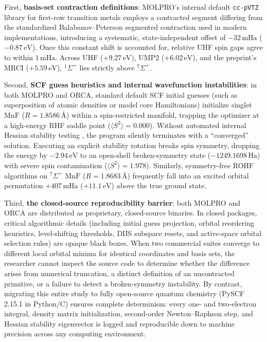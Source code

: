 \documentclass[10pt,twocolumn]{article}
\begin{document}
First, \textbf{basis-set contraction definitions}: MOLPRO's internal default \texttt{cc-pVTZ} library for first-row transition metals employs a contracted segment differing from the standardized Balabanov--Peterson segmented contraction \cite{balabanov2005} used in modern implementations, introducing a systematic, state-independent offset of $-32\,\mathrm{mHa}$ ($-0.87\,\mathrm{eV}$). Once this constant shift is accounted for, relative UHF spin gaps agree to within $1\,\mathrm{mHa}$. Across UHF ($+9.27\,\mathrm{eV}$), UMP2 ($+6.02\,\mathrm{eV}$), and the preprint's MRCI ($+5.59\,\mathrm{eV}$), $^1\Sigma^+$ lies strictly above $^7\Sigma^+$.

Second, \textbf{SCF guess heuristics and internal wavefunction instabilities}: in both MOLPRO and ORCA, standard default SCF initial guesses (such as superposition of atomic densities or model core Hamiltonians) initialize singlet $\mathrm{MnF}$ ($R = 1.8586\,$\AA) within a spin-restricted manifold, trapping the optimizer at a high-energy RHF saddle point ($\langle S^2 \rangle = 0.000$). Without automated internal Hessian stability testing \cite{seeger1977}, the program silently terminates with a ``converged'' solution. Executing an explicit stability rotation breaks spin symmetry, dropping the energy by $-2.94\,\mathrm{eV}$ to an open-shell broken-symmetry state ($-1249.1698\,\mathrm{Ha}$) with severe spin contamination ($\langle S^2 \rangle = 1.978$). Similarly, symmetry-free ROHF algorithms on $^7\Sigma^+$ $\mathrm{MnF}$ ($R = 1.8683\,$\AA) frequently fall into an excited orbital permutation $+407\,\mathrm{mHa}$ ($+11.1\,\mathrm{eV}$) above the true ground state.

Third, \textbf{the closed-source reproducibility barrier}: both MOLPRO and ORCA are distributed as proprietary, closed-source binaries. In closed packages, critical algorithmic details (including initial guess projection, orbital reordering heuristics, level-shifting thresholds, DIIS subspace resets, and active-space orbital selection rules) are opaque black boxes. When two commercial suites converge to different local orbital minima for identical coordinates and basis sets, the researcher cannot inspect the source code to determine whether the difference arises from numerical truncation, a distinct definition of an uncontracted primitive, or a failure to detect a broken-symmetry instability. By contrast, migrating this entire study to fully open-source quantum chemistry (PySCF 2.15.1 in Python/C) ensures complete determinism: every one- and two-electron integral, density matrix initialization, second-order Newton--Raphson step, and Hessian stability eigenvector is logged and reproducible down to machine precision across any computing environment.
\end{document}
